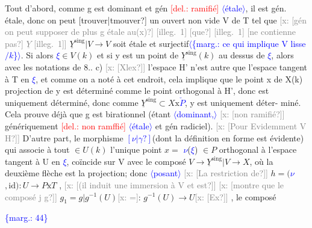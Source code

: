 \documentclass[11pt]{article}
\newcommand{\scanpage}[1]{\par\bigskip\noindent{\small\sffamily[scan #1]}\par}
\newcommand{\mspage}[1]{{\small\sffamily[p.\,#1]}}
\newcommand{\hand}[1]{\textcolor{blue}{#1}}
\let\over\relax
\newcommand{\over}[2]{\textcolor{gray}{#1}\textcolor{blue}{\ensuremath{^{\!\nearrow}}#2}}
\newcommand{\inserted}[2][]{\textcolor{blue}{$\langle$#2$\rangle$}}
\newcommand{\margin}[1]{\textcolor{blue}{\{\textsf{marg.:} #1\}}}
\newcommand{\deleted}[1]{\textcolor{red}{[\textsf{del.:} #1]}}
\newcommand{\xout}[1]{\textcolor{gray}{[\textsf{x:} #1]}}
\newcommand{\unsure}[1]{[#1?]}
\newcommand{\illegible}[1]{[\textsf{illeg.\ #1}]}
\begin{document}
Tout d'abord, comme g est dominant et gén \deleted{ramifié} \inserted{étale}, il est
gén. étale, donc on peut \unsure{trouver|tmouver} un ouvert non vide V de T tel que
\xout{\unsure{gén on peut supposer de plus g étale au(x)} \illegible{1} \unsure{que} \illegible{1} \unsure{ne contienne pas} $\underline{Y}$ \illegible{1}}
$\underline{Y}^{\text{sing}}|V \longrightarrow V$ soit étale et surjectif\inserted{\margin{ce qui implique V lisse$/k$}}. Si alors \hand{$\xi$}$\in V(k)$ et si y est
un point de $\underline{Y}^{\text{sing}}(k)$ au dessus de \hand{$\xi$}, alors avec les notations de
8.\over{\unsure{6}}{7}. c) \xout{\unsure{Xlex}} l'espace H' n'est autre que l'espace tangent à T en \hand{$\xi$},
et comme on a noté à cet endroit, cela implique que le point x de X(k)
projection de y est déterminé comme le point orthogonal à H', donc est
uniquement déterminé, donc comme $\underline{Y}^{\text{sing}}\subset X\text{x}$\hand{$\check{P}$}, y est uniquement déter-%
miné. Cela prouve déjà que g est birationnel (étant \inserted[typed]{dominant,} \xout{\unsure{non ramifié}}
génériquement \deleted{non ramffié} \inserted{étale} et gén radiciel). \xout{\unsure{Pour Evidemment V H}}
D'autre part, le morphisme \hand{$\unsure{\nu|\gamma}$}(dont la définition en forme est évidente)
qui associe à tout \over{x}{$\xi$}$\in U(k)$ l'unique point $x=$ \hand{$\nu$}(\hand{$\xi$}) $\in P$ orthogonal à
l'espace tangent à U en \hand{$\xi$}, coïncide sur V avec le composé
$V\rightarrow \underline{Y}^{\text{sing}}|V \longrightarrow X$, où la deuxième flèche est la projection; donc
\inserted[typed]{posant} \xout{\unsure{La restriction de}} $h=($\hand{$\nu$}$,\mathrm{id}) : U\rightarrow P\text{x}T$ , \xout{\unsure{(il induit une immersion à V et est}}
\xout{\unsure{montre que le composé j g}} $g_1 = g|g^{-1}(U)$\xout{=}: $g^{-1}(U)\rightarrow U$\xout{\unsure{Ex}} , le composé

\margin{44}

\clearpage
\scanpage{25/45}
\mspage{\hand{\unsure{49|41}}}
\end{document}
